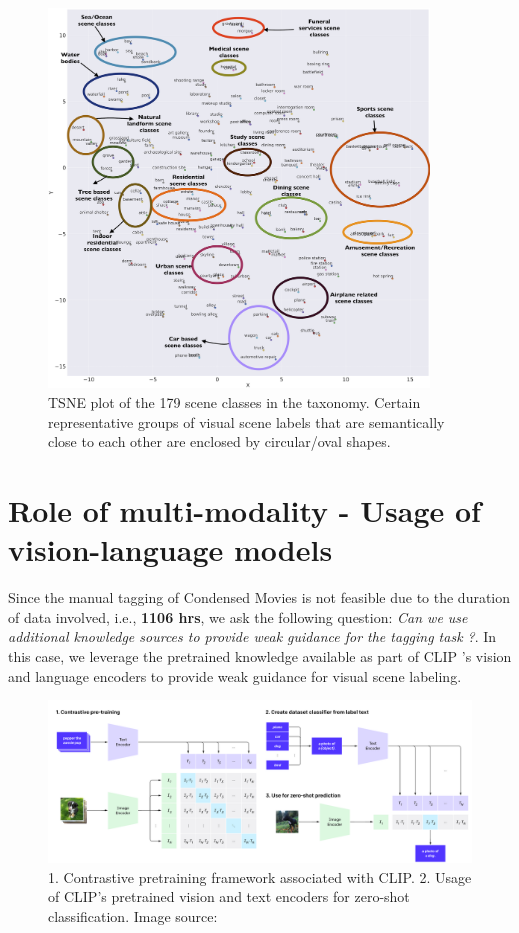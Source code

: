 \begin{figure}[h!]
    \centering
    \includegraphics[width=0.9\textwidth]{figures/tsne_hvu_slugline_combined.png}
    \caption{TSNE plot of the 179 scene classes in the taxonomy. Certain representative groups of visual scene labels that are semantically close to each other are enclosed by circular/oval shapes. }
    \label{tsneplot}
\end{figure}

\section{Role of multi-modality - Usage of vision-language models}

Since the manual tagging of Condensed Movies \cite{bain2020condensed} is not feasible due to the duration of data involved, i.e., \textbf{1106 hrs},  we ask the following question:  \textit{Can we use additional knowledge sources to provide weak guidance for the tagging task ?}. In this case, we leverage the pretrained knowledge available as part of CLIP \cite{CLIP}'s vision and language encoders to provide weak guidance for visual scene labeling. 

\begin{figure}[h!]
\centering
  \includegraphics[width=\linewidth]{figures/CLIP_outline_diagram.png}
  \caption{1. Contrastive pretraining framework associated with CLIP. 2. Usage of CLIP's pretrained vision and text encoders for zero-shot classification. Image source: \cite{CLIP}}
  \label{CLIP outline}
\end{figure}

